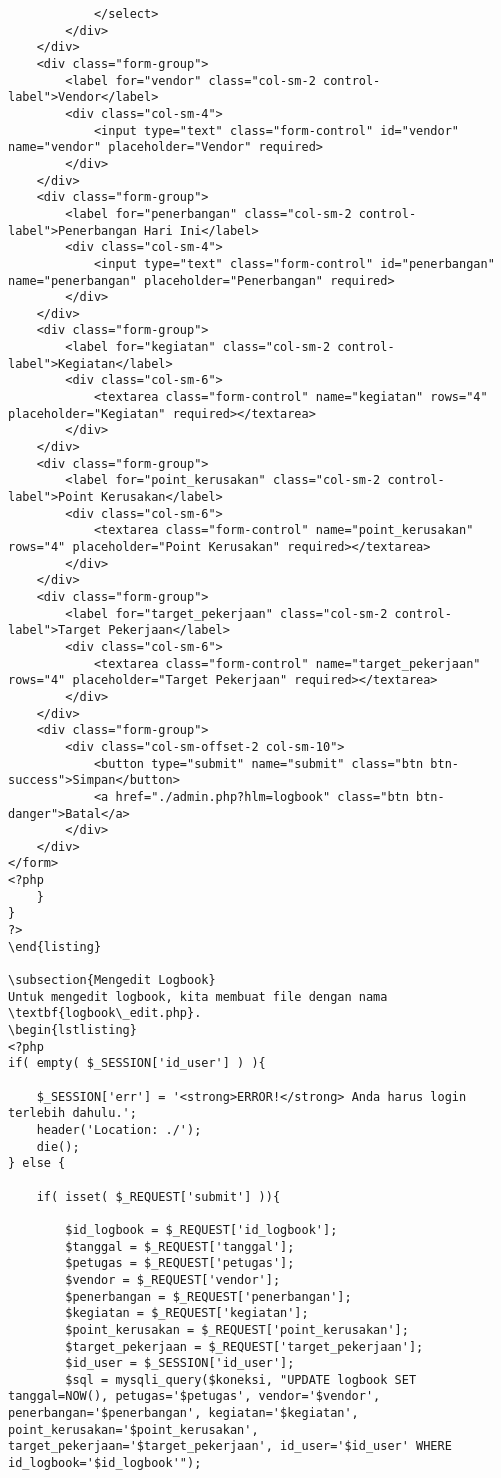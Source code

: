 \begin{lstlisting}
			</select>
		</div>
	</div>
	<div class="form-group">
		<label for="vendor" class="col-sm-2 control-label">Vendor</label>
		<div class="col-sm-4">
			<input type="text" class="form-control" id="vendor" name="vendor" placeholder="Vendor" required>
		</div>
	</div>
	<div class="form-group">
		<label for="penerbangan" class="col-sm-2 control-label">Penerbangan Hari Ini</label>
		<div class="col-sm-4">
			<input type="text" class="form-control" id="penerbangan" name="penerbangan" placeholder="Penerbangan" required>
		</div>
	</div>
	<div class="form-group">
		<label for="kegiatan" class="col-sm-2 control-label">Kegiatan</label>
		<div class="col-sm-6">
			<textarea class="form-control" name="kegiatan" rows="4" placeholder="Kegiatan" required></textarea>
		</div>
	</div>
	<div class="form-group">
		<label for="point_kerusakan" class="col-sm-2 control-label">Point Kerusakan</label>
		<div class="col-sm-6">
			<textarea class="form-control" name="point_kerusakan" rows="4" placeholder="Point Kerusakan" required></textarea>
		</div>
	</div>
	<div class="form-group">
		<label for="target_pekerjaan" class="col-sm-2 control-label">Target Pekerjaan</label>
		<div class="col-sm-6">
			<textarea class="form-control" name="target_pekerjaan" rows="4" placeholder="Target Pekerjaan" required></textarea>
		</div>
	</div>
	<div class="form-group">
		<div class="col-sm-offset-2 col-sm-10">
			<button type="submit" name="submit" class="btn btn-success">Simpan</button>
			<a href="./admin.php?hlm=logbook" class="btn btn-danger">Batal</a>
		</div>
	</div>
</form>
<?php
	}
}
?>
\end{listing}

\subsection{Mengedit Logbook}
Untuk mengedit logbook, kita membuat file dengan nama \textbf{logbook\_edit.php}.
\begin{lstlisting}
<?php
if( empty( $_SESSION['id_user'] ) ){

	$_SESSION['err'] = '<strong>ERROR!</strong> Anda harus login terlebih dahulu.';
	header('Location: ./');
	die();
} else {

	if( isset( $_REQUEST['submit'] )){

		$id_logbook = $_REQUEST['id_logbook'];
		$tanggal = $_REQUEST['tanggal'];
		$petugas = $_REQUEST['petugas'];
		$vendor = $_REQUEST['vendor'];
		$penerbangan = $_REQUEST['penerbangan'];
		$kegiatan = $_REQUEST['kegiatan'];
		$point_kerusakan = $_REQUEST['point_kerusakan'];
		$target_pekerjaan = $_REQUEST['target_pekerjaan'];
		$id_user = $_SESSION['id_user'];
		$sql = mysqli_query($koneksi, "UPDATE logbook SET tanggal=NOW(), petugas='$petugas', vendor='$vendor', penerbangan='$penerbangan', kegiatan='$kegiatan', point_kerusakan='$point_kerusakan', target_pekerjaan='$target_pekerjaan', id_user='$id_user' WHERE id_logbook='$id_logbook'");


\end{lstlisting}
